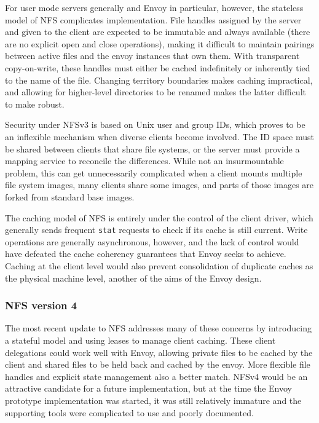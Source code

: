 For user mode servers generally and Envoy in particular, however, the stateless model of NFS complicates implementation. File handles assigned by the server and given to the client are expected to be immutable and always available (there are no explicit open and close operations), making it difficult to maintain pairings between active files and the envoy instances that own them. With transparent copy-on-write, these handles must either be cached indefinitely or inherently tied to the name of the file. Changing territory boundaries makes caching impractical, and allowing for higher-level directories to be renamed makes the latter difficult to make robust.

Security under NFSv3 is based on Unix user and group IDs, which proves to be an inflexible mechanism when diverse clients become involved. The ID space must be shared between clients that share file systems, or the server must provide a mapping service to reconcile the differences. While not an insurmountable problem, this can get unnecessarily complicated when a client mounts multiple file system images, many clients share some images, and parts of those images are forked from standard base images.

The caching model of NFS is entirely under the control of the client driver, which generally sends frequent \texttt{stat} requests to check if its cache is still current. Write operations are generally asynchronous, however, and the lack of control would have defeated the cache coherency guarantees that Envoy seeks to achieve. Caching at the client level would also prevent consolidation of duplicate caches as the physical machine level, another of the aims of the Envoy design.

\subsubsection{NFS version 4}

The most recent update to NFS addresses many of these concerns by introducing a stateful model and using leases to manage client caching. These client delegations could work well with Envoy, allowing private files to be cached by the client and shared files to be held back and cached by the envoy. More flexible file handles and explicit state management also a better match. NFSv4 would be an attractive candidate for a future implementation, but at the time the Envoy prototype implementation was started, it was still relatively immature and the supporting tools were complicated to use and poorly documented.

